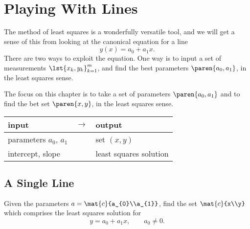 \chapter{Playing With Lines}

The method of least squares is a wonderfully versatile tool, and we will get a sense of this from looking at the canonical equation for a line
  \begin{equation*}   %
      y(x) = a_{0} + a_{1} x.
  \end{equation*}
There are two ways to exploit the equation. One way is to input a set of measurements $\lst{x_{k},y_{k}}_{k=1}^{m}$, and find the best parameters $\paren{a_{0},a_{1}}$, in the least squares sense. 

The focus on this chapter is to take a set of parameters $\paren{a_{0},a_{1}}$ and to find the bet set $\paren{x, y}$, in the least squares sense.	

\begin{table}[htbp]  %
    \begin{center}
        \begin{tabular}{lcl}
            input & $\rightarrow$ & output \\\hline
            parameters $a_{0}$, $a_{1}$ && set $(x, y)$\\
			intercept, slope && least squares solution
        \end{tabular}
    \end{center}
\end{table}%


\section{A Single Line}  %

Given the parameters $a=\mat{c}{a_{0}\\a_{1}}$, find the set $\mat{c}{x\\y}$ which comprises the least squares solution for
  \begin{equation}   %
      y = a_{0} + a_{1} x, \qquad a_{0} \ne 0.
   \label{eq:myline}
  \end{equation}

